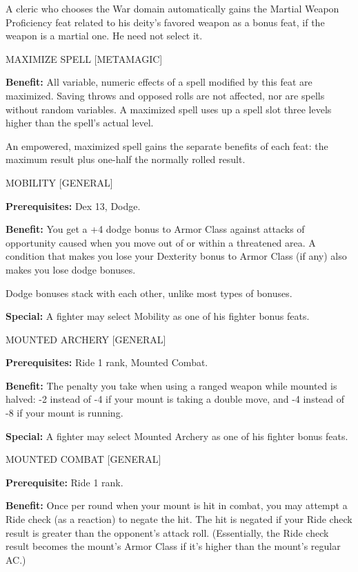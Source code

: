 \documentclass{article}
\begin{document}
A cleric who chooses the War domain automatically gains the Martial Weapon Proficiency 
feat related to his deity's favored weapon as a bonus feat, if the weapon is a 
martial one. He need not select it.

\vspace{12pt}
MAXIMIZE SPELL [METAMAGIC]

\textbf{Benefit:} All variable, numeric effects of a spell modified by this feat 
are maximized. Saving throws and opposed rolls are not affected, nor are spells 
without random variables. A maximized spell uses up a spell slot three levels higher 
than the spell's actual level.

An empowered, maximized spell gains the separate benefits of each feat: the maximum 
result plus one-half the normally rolled result.

\vspace{12pt}
MOBILITY [GENERAL]

\textbf{Prerequisites:} Dex 13, Dodge.

\textbf{Benefit:} You get a +4 dodge bonus to Armor Class against attacks of opportunity 
caused when you move out of or within a threatened area. A condition that makes 
you lose your Dexterity bonus to Armor Class (if any) also makes you lose dodge 
bonuses.

Dodge bonuses stack with each other, unlike most types of bonuses.

\textbf{Special:} A fighter may select Mobility as one of his fighter bonus feats.

\vspace{12pt}
MOUNTED ARCHERY [GENERAL]

\textbf{Prerequisites:} Ride 1 rank, Mounted Combat.

\textbf{Benefit:} The penalty you take when using a ranged weapon while mounted 
is halved: -2 instead of -4 if your mount is taking a double move, and -4 instead 
of -8 if your mount is running.

\textbf{Special:} A fighter may select Mounted Archery as one of his fighter bonus 
feats.

\vspace{12pt}
MOUNTED COMBAT [GENERAL]

\textbf{Prerequisite:} Ride 1 rank.

\textbf{Benefit:} Once per round when your mount is hit in combat, you may attempt 
a Ride check (as a reaction) to negate the hit. The hit is negated if your Ride 
check result is greater than the opponent's attack roll. (Essentially, the Ride 
check result becomes the mount's Armor Class if it's higher than the mount's regular 
AC.)
\end{document}
